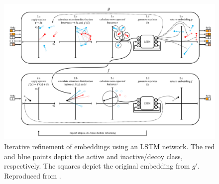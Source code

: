 \begin{figure}[h]
	\centering
	\includegraphics[width=\linewidth]{img/iterreflstm.png}
	\caption{Iterative refinement of embeddings using an LSTM network. The red and blue points depict the active and inactive/decoy class, respectively. The squares depict the original embedding from $g'$. Reproduced from \citet{altae2017low}.}
	\label{fig:iterreflstm}
\end{figure}
